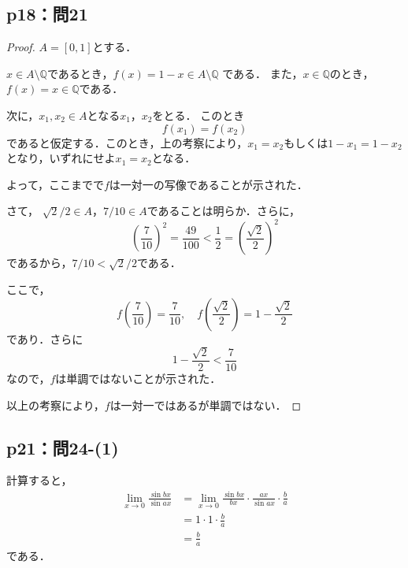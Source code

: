 \documentclass[uplatex,dvipdfmx,a4paper,10pt,fleqn]{jsarticle}
\newenvironment{tleftbar}{\begin{tbleftline}\setlength{\parindent}{1zw}}{\end{tbleftline}}
\begin{document}
\subsection*{p18：問21}

\begin{tleftbar}
    \begin{proof}
    $ A = [0,1]$とする．

    $x \in A \setminus \mathbb{Q}$であるとき，$f(x)=1-x \in A \setminus \mathbb{Q}$ である．
    また，$x \in \mathbb{Q}$のとき，$f(x)=x \in \mathbb{Q}$である．

    次に，$ x_1 , x_2 \in A$となる$x_1$，$x_2$をとる．
    このとき
    \[
        f(x_1)=f(x_2)
    \]
    であると仮定する．このとき，上の考察により，$x_1 = x_2$もしくは$1-x_1 = 1-x_2$となり，いずれにせよ$x_1 =x_2$となる．

    よって，ここまでで$f$は一対一の写像であることが示された．
   
   さて， $ \sqrt{2}/2 \in A$，$7/10 \in A$であることは明らか．さらに，
    \[
        \left ( \frac{7}{10} \right)^2 = \frac{49}{100} <\frac{1}{2}=\left ( \frac{\sqrt{2}}{2} \right)^2 
    \]
    であるから，$7/10< \sqrt{2}/2$である．

    ここで，
    \[
    f\left ( \frac{7}{10} \right)=\frac{7}{10},\quad f\left(\frac{\sqrt{2}}{2} \right)= 1-\frac{\sqrt{2}}{2}
    \]
    であり．さらに
    \[
        1-\frac{\sqrt{2}}{2} <\frac{7}{10}
    \]
    なので，$f$は単調ではないことが示された．

    以上の考察により，$f$は一対一ではあるが単調ではない．
\end{proof}
\end{tleftbar}

\subsection*{p21：問24-(1)}

\begin{tleftbar}
    計算すると，
    \begin{align*} 
        \lim_{x \to 0} \frac{\sin bx}{\sin ax} & = \lim_{x \to 0} \frac{\sin bx}{b x} \cdot \frac{ax}{ \sin ax} \cdot \frac{b}{a} \\
        & = 1 \cdot 1 \cdot \frac{b}{a} \\
        & = \frac{b}{a}
    \end{align*} 
    である．
\end{tleftbar}
\end{document}
